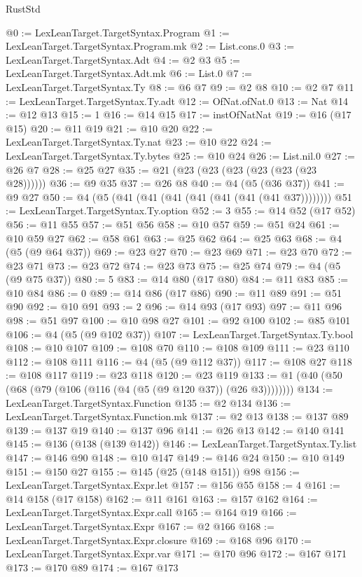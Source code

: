 \begin{lexlean}{RustStd}
\begin{coremodule}
{\begin{coremodule}
{{{{{{{{{{{{{{{{{{{{{{{{{{{{{{{{{{@0 := LexLeanTarget.TargetSyntax.Program
@1 := LexLeanTarget.TargetSyntax.Program.mk
@2 := List.cons.{0}
@3 := LexLeanTarget.TargetSyntax.Adt
@4 := @2 @3
@5 := LexLeanTarget.TargetSyntax.Adt.mk
@6 := List.{0}
@7 := LexLeanTarget.TargetSyntax.Ty
@8 := @6 @7
@9 := @2 @8
@10 := @2 @7
@11 := LexLeanTarget.TargetSyntax.Ty.adt
@12 := OfNat.ofNat.{0}
@13 := Nat
@14 := @12 @13
@15 := 1
@16 := @14 @15
@17 := instOfNatNat
@19 := @16 (@17 @15)
@20 := @11 @19
@21 := @10 @20
@22 := LexLeanTarget.TargetSyntax.Ty.nat
@23 := @10 @22
@24 := LexLeanTarget.TargetSyntax.Ty.bytes
@25 := @10 @24
@26 := List.nil.{0}
@27 := @26 @7
@28 := @25 @27
@35 := @21 (@23 (@23 (@23 (@23 (@23 (@23 @28))))))
@36 := @9 @35
@37 := @26 @8
@40 := @4 (@5 (@36 @37))
@41 := @9 @27
@50 := @4 (@5 (@41 (@41 (@41 (@41 (@41 (@41 (@41 @37))))))))
@51 := LexLeanTarget.TargetSyntax.Ty.option
@52 := 3
@55 := @14 @52 (@17 @52)
@56 := @11 @55
@57 := @51 @56
@58 := @10 @57
@59 := @51 @24
@61 := @10 @59 @27
@62 := @58 @61
@63 := @25 @62
@64 := @25 @63
@68 := @4 (@5 (@9 @64 @37))
@69 := @23 @27
@70 := @23 @69
@71 := @23 @70
@72 := @23 @71
@73 := @23 @72
@74 := @23 @73
@75 := @25 @74
@79 := @4 (@5 (@9 @75 @37))
@80 := 5
@83 := @14 @80 (@17 @80)
@84 := @11 @83
@85 := @10 @84
@86 := 0
@89 := @14 @86 (@17 @86)
@90 := @11 @89
@91 := @51 @90
@92 := @10 @91
@93 := 2
@96 := @14 @93 (@17 @93)
@97 := @11 @96
@98 := @51 @97
@100 := @10 @98 @27
@101 := @92 @100
@102 := @85 @101
@106 := @4 (@5 (@9 @102 @37))
@107 := LexLeanTarget.TargetSyntax.Ty.bool
@108 := @10 @107
@109 := @108 @70
@110 := @108 @109
@111 := @23 @110
@112 := @108 @111
@116 := @4 (@5 (@9 @112 @37))
@117 := @108 @27
@118 := @108 @117
@119 := @23 @118
@120 := @23 @119
@133 := @1 (@40 (@50 (@68 (@79 (@106 (@116 (@4 (@5 (@9 @120 @37)) (@26 @3))))))))
@134 := LexLeanTarget.TargetSyntax.Function
@135 := @2 @134
@136 := LexLeanTarget.TargetSyntax.Function.mk
@137 := @2 @13
@138 := @137 @89
@139 := @137 @19
@140 := @137 @96
@141 := @26 @13
@142 := @140 @141
@145 := @136 (@138 (@139 @142))
@146 := LexLeanTarget.TargetSyntax.Ty.list
@147 := @146 @90
@148 := @10 @147
@149 := @146 @24
@150 := @10 @149
@151 := @150 @27
@155 := @145 (@25 (@148 @151)) @98
@156 := LexLeanTarget.TargetSyntax.Expr.let
@157 := @156 @55
@158 := 4
@161 := @14 @158 (@17 @158)
@162 := @11 @161
@163 := @157 @162
@164 := LexLeanTarget.TargetSyntax.Expr.call
@165 := @164 @19
@166 := LexLeanTarget.TargetSyntax.Expr
@167 := @2 @166
@168 := LexLeanTarget.TargetSyntax.Expr.closure
@169 := @168 @96
@170 := LexLeanTarget.TargetSyntax.Expr.var
@171 := @170 @96
@172 := @167 @171
@173 := @170 @89
@174 := @167 @173
}}}}}}}}}}}}}}}}}}}}}}}}}}}}}}}}}}
\end{coremodule}}
\end{coremodule}
\end{lexlean}
